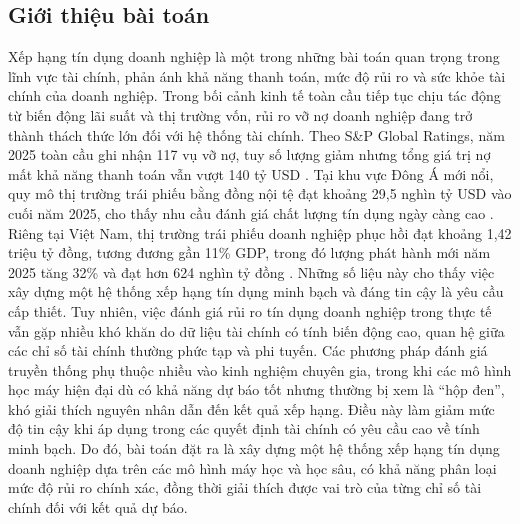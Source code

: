 \documentclass[10pt,twoside]{article}
\begin{document}
\subsection{Giới thiệu bài toán}
Xếp hạng tín dụng doanh nghiệp là một trong những bài toán quan trọng trong lĩnh vực tài chính, phản ánh khả năng thanh toán, mức độ rủi ro và sức khỏe tài chính của doanh nghiệp. Trong bối cảnh kinh tế toàn cầu tiếp tục chịu tác động từ biến động lãi suất và thị trường vốn, rủi ro vỡ nợ doanh nghiệp đang trở thành thách thức lớn đối với hệ thống tài chính. Theo S\&P Global Ratings, năm 2025 toàn cầu ghi nhận 117 vụ vỡ nợ, tuy số lượng giảm nhưng tổng giá trị nợ mất khả năng thanh toán vẫn vượt 140 tỷ USD \cite{noauthor_default_nodate}. Tại khu vực Đông Á mới nổi, quy mô thị trường trái phiếu bằng đồng nội tệ đạt khoảng 29,5 nghìn tỷ USD vào cuối năm 2025, cho thấy nhu cầu đánh giá chất lượng tín dụng ngày càng cao \cite{asian_development_bank_asia_2017}. Riêng tại Việt Nam, thị trường trái phiếu doanh nghiệp phục hồi đạt khoảng 1,42 triệu tỷ đồng, tương đương gần 11\% GDP, trong đó lượng phát hành mới năm 2025 tăng 32\% và đạt hơn 624 nghìn tỷ đồng \cite{noauthor_tong_nodate}. Những số liệu này cho thấy việc xây dựng một hệ thống xếp hạng tín dụng minh bạch và đáng tin cậy là yêu cầu cấp thiết. Tuy nhiên, việc đánh giá rủi ro tín dụng doanh nghiệp trong thực tế vẫn gặp nhiều khó khăn do dữ liệu tài chính có tính biến động cao, quan hệ giữa các chỉ số tài chính thường phức tạp và phi tuyến. Các phương pháp đánh giá truyền thống phụ thuộc nhiều vào kinh nghiệm chuyên gia, trong khi các mô hình học máy hiện đại dù có khả năng dự báo tốt nhưng thường bị xem là “hộp đen”, khó giải thích nguyên nhân dẫn đến kết quả xếp hạng. Điều này làm giảm mức độ tin cậy khi áp dụng trong các quyết định tài chính có yêu cầu cao về tính minh bạch. Do đó, bài toán đặt ra là xây dựng một hệ thống xếp hạng tín dụng doanh nghiệp dựa trên các mô hình máy học và học sâu, có khả năng phân loại mức độ rủi ro chính xác, đồng thời giải thích được vai trò của từng chỉ số tài chính đối với kết quả dự báo.
\end{document}
